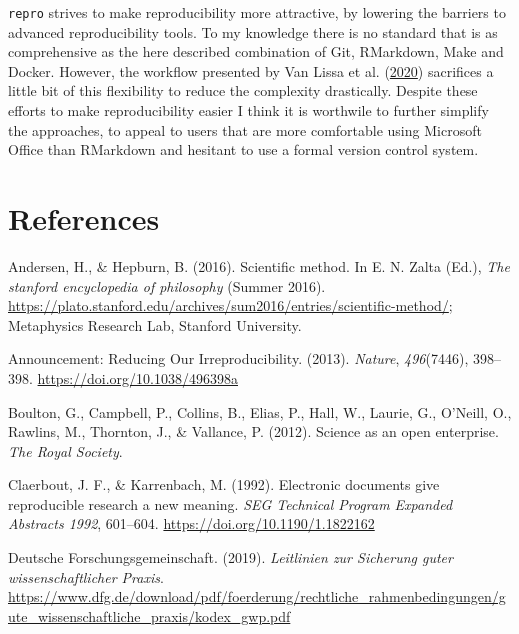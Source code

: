 \documentclass[12pt,a4paper,]{article}
\begin{document}
\texttt{repro} strives to make reproducibility more attractive, by lowering the barriers to advanced reproducibility tools.
To my knowledge there is no standard that is as comprehensive as the here described combination of Git, RMarkdown, Make and Docker.
However, the workflow presented by Van Lissa et al. (\protect\hyperlink{ref-vanlissaWORCSWorkflowOpen2020}{2020}) sacrifices a little bit of this flexibility to reduce the complexity drastically.
Despite these efforts to make reproducibility easier I think it is worthwile to further simplify the approaches, to appeal to users that are more comfortable using Microsoft Office than RMarkdown and hesitant to use a formal version control system.

\hypertarget{references}{%
\section*{References}\label{references}}

\hypertarget{refs}{}
\leavevmode\hypertarget{ref-andersonScientificMethod2016}{}%
Andersen, H., \& Hepburn, B. (2016). Scientific method. In E. N. Zalta (Ed.), \emph{The stanford encyclopedia of philosophy} (Summer 2016). \url{https://plato.stanford.edu/archives/sum2016/entries/scientific-method/}; Metaphysics Research Lab, Stanford University.

\leavevmode\hypertarget{ref-AnnouncementReducingOur2013}{}%
Announcement: Reducing Our Irreproducibility. (2013). \emph{Nature}, \emph{496}(7446), 398--398. \url{https://doi.org/10.1038/496398a}

\leavevmode\hypertarget{ref-boultonScienceOpenEnterprise2012}{}%
Boulton, G., Campbell, P., Collins, B., Elias, P., Hall, W., Laurie, G., O'Neill, O., Rawlins, M., Thornton, J., \& Vallance, P. (2012). Science as an open enterprise. \emph{The Royal Society}.

\leavevmode\hypertarget{ref-claerboutElectronicDocumentsGive1992}{}%
Claerbout, J. F., \& Karrenbach, M. (1992). Electronic documents give reproducible research a new meaning. \emph{SEG Technical Program Expanded Abstracts 1992}, 601--604. \url{https://doi.org/10.1190/1.1822162}

\leavevmode\hypertarget{ref-dfg2019}{}%
Deutsche Forschungsgemeinschaft. (2019). \emph{Leitlinien zur Sicherung guter wissenschaftlicher Praxis}. \url{https://www.dfg.de/download/pdf/foerderung/rechtliche_rahmenbedingungen/gute_wissenschaftliche_praxis/kodex_gwp.pdf}
\end{document}
